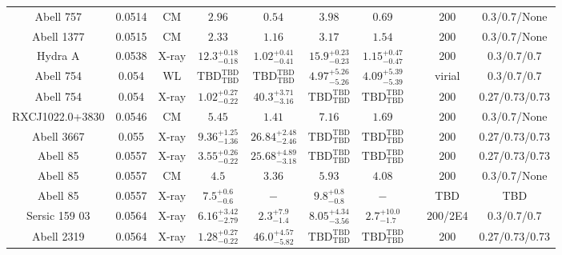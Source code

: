 \begin{table}
\begin{tabular}{cccccccccc}
Abell 757 & 0.0514 & CM & ${2.96}^{}_{}$ & ${0.54}^{}_{}$ & ${3.98}^{}_{}$ & ${0.69}^{}_{}$ & \citet{RI06.1} & 200 & 0.3/0.7/None \\
Abell 1377 & 0.0515 & CM & ${2.33}^{}_{}$ & ${1.16}^{}_{}$ & ${3.17}^{}_{}$ & ${1.54}^{}_{}$ & \citet{RI06.1} & 200 & 0.3/0.7/None \\
Hydra A & 0.0538 & X-ray & ${12.3}^{+0.18}_{-0.18}$ & ${1.02}^{+0.41}_{-0.41}$ & ${15.9}^{+0.23}_{-0.23}$ & ${1.15}^{+0.47}_{-0.47}$ & \citet{DA01.1} & 200 & 0.3/0.7/0.7 \\
Abell 754 & 0.054 & WL & ${\mathrm{TBD}}^{\mathrm{TBD}}_{\mathrm{TBD}}$ & ${\mathrm{TBD}}^{\mathrm{TBD}}_{\mathrm{TBD}}$ & ${4.97}^{+5.26}_{-5.26}$ & ${4.09}^{+5.39}_{-5.39}$ & \citet{OK08.1} & virial & 0.3/0.7/0.7 \\
Abell 754 & 0.054 & X-ray & ${1.02}^{+0.27}_{-0.22}$ & ${40.3}^{+3.71}_{-3.16}$ & ${\mathrm{TBD}}^{\mathrm{TBD}}_{\mathrm{TBD}}$ & ${\mathrm{TBD}}^{\mathrm{TBD}}_{\mathrm{TBD}}$ & \citet{BA14.1} & 200 & 0.27/0.73/0.73 \\
RXCJ1022.0+3830 & 0.0546 & CM & ${5.45}^{}_{}$ & ${1.41}^{}_{}$ & ${7.16}^{}_{}$ & ${1.69}^{}_{}$ & \citet{RI06.1} & 200 & 0.3/0.7/None \\
Abell 3667 & 0.055 & X-ray & ${9.36}^{+1.25}_{-1.36}$ & ${26.84}^{+2.48}_{-2.46}$ & ${\mathrm{TBD}}^{\mathrm{TBD}}_{\mathrm{TBD}}$ & ${\mathrm{TBD}}^{\mathrm{TBD}}_{\mathrm{TBD}}$ & \citet{BA14.1} & 200 & 0.27/0.73/0.73 \\
Abell 85 & 0.0557 & X-ray & ${3.55}^{+0.26}_{-0.22}$ & ${25.68}^{+4.89}_{-3.18}$ & ${\mathrm{TBD}}^{\mathrm{TBD}}_{\mathrm{TBD}}$ & ${\mathrm{TBD}}^{\mathrm{TBD}}_{\mathrm{TBD}}$ & \citet{BA14.1} & 200 & 0.27/0.73/0.73 \\
Abell 85 & 0.0557 & CM & ${4.5}^{}_{}$ & ${3.36}^{}_{}$ & ${5.93}^{}_{}$ & ${4.08}^{}_{}$ & \citet{RI06.1} & 200 & 0.3/0.7/None \\
Abell 85 & 0.0557 & X-ray & ${7.5}^{+0.6}_{-0.6}$ & ${-}^{}_{}$ & ${9.8}^{+0.8}_{-0.8}$ & ${-}^{}_{}$ & \citet{XU01.1} & TBD & TBD \\
Sersic 159 03 & 0.0564 & X-ray & ${6.16}^{+3.42}_{-2.79}$ & ${2.3}^{+7.9}_{-1.4}$ & ${8.05}^{+4.34}_{-3.56}$ & ${2.7}^{+10.0}_{-1.7}$ & \citet{VO06.1} & 200/2E4 & 0.3/0.7/0.7 \\
Abell 2319 & 0.0564 & X-ray & ${1.28}^{+0.27}_{-0.22}$ & ${46.0}^{+4.57}_{-5.82}$ & ${\mathrm{TBD}}^{\mathrm{TBD}}_{\mathrm{TBD}}$ & ${\mathrm{TBD}}^{\mathrm{TBD}}_{\mathrm{TBD}}$ & \citet{BA14.1} & 200 & 0.27/0.73/0.73 \\

\end{tabular}
\end{table}
